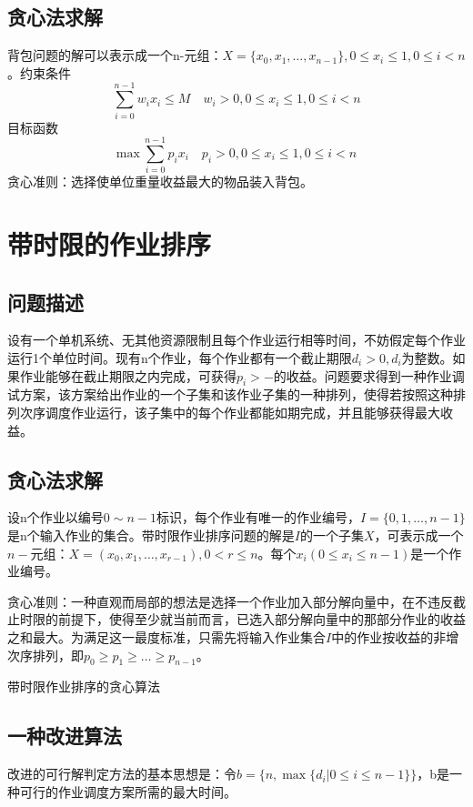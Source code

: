 \subsection*{贪心法求解}
背包问题的解可以表示成一个n-元组：$X=\{x_0,x_1,\dots,x_{n-1}\},0\leq x_i\leq 1,0\leq i<n$。约束条件
\begin{equation}
	\sum_{i=0}^{n-1}w_ix_i\leq M\quad w_i>0,0\leq x_i\leq 1,0\leq i<n
\end{equation}
目标函数
\begin{equation}
	\mathrm{max}\ \sum_{i=0}^{n-1}p_ix_i\quad p_i>0,0\leq x_i\leq 1,0\leq i<n
\end{equation}
贪心准则：选择使单位重量收益最大的物品装入背包。
\section{带时限的作业排序}
\subsection*{问题描述}
设有一个单机系统、无其他资源限制且每个作业运行相等时间，不妨假定每个作业运行1个单位时间。现有n个作业，每个作业都有一个截止期限$d_i>0,d_i$为整数。如果作业能够在截止期限之内完成，可获得$p_i>-$的收益。问题要求得到一种作业调试方案，该方案给出作业的一个子集和该作业子集的一种排列，使得若按照这种排列次序调度作业运行，该子集中的每个作业都能如期完成，并且能够获得最大收益。
\subsection*{贪心法求解}
设n个作业以编号$0\sim n-1$标识，每个作业有唯一的作业编号，$I=\{0,1,\dots, n-1\}$是n个输入作业的集合。带时限作业排序问题的解是$I$的一个子集$X$，可表示成一个$n-$元组：$X=(x_0,x_1,\dots,x_{r-1}),0<r\leq n$。每个$x_i(0\leq x_i\leq n-1)$是一个作业编号。

贪心准则：一种直观而局部的想法是选择一个作业加入部分解向量中，在不违反截止时限的前提下，使得至少就当前而言，已选入部分解向量中的那部分作业的收益之和最大。为满足这一最度标准，只需先将输入作业集合$I$中的作业按收益的非增次序排列，即$p_0\geq p_1\geq \dots \geq p_{n-1}$。

带时限作业排序的贪心算法


\subsection*{一种改进算法}
改进的可行解判定方法的基本思想是：令$b=\{n,\max\{d_i|0\leq i\leq n-1 \} \}$，b是一种可行的作业调度方案所需的最大时间。

